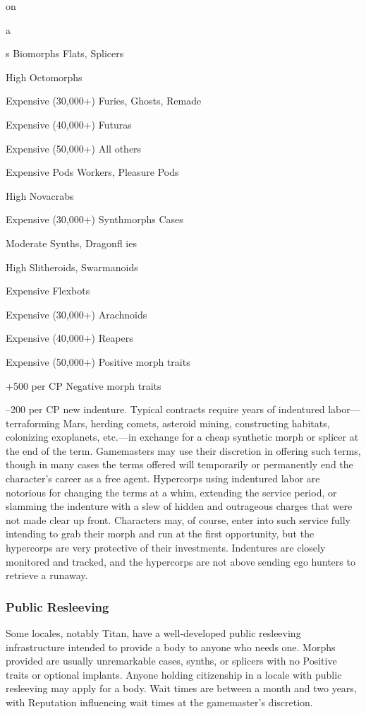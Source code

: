 on 

a

s 
Biomorphs
Flats, Splicers

High
Octomorphs

Expensive (30,000+)
Furies, Ghosts, Remade

Expensive (40,000+)
Futuras

Expensive (50,000+)
All others

Expensive
Pods
Workers, Pleasure Pods

High
Novacrabs

Expensive (30,000+)
Synthmorphs
Cases

Moderate
Synths, Dragonﬂ ies

High
Slitheroids, Swarmanoids

Expensive
Flexbots

Expensive (30,000+)
Arachnoids

Expensive (40,000+)
Reapers

Expensive (50,000+)
Positive morph traits

+500 per CP
Negative morph traits

–200 per CP
new indenture. Typical contracts require years of indentured
labor—terraforming Mars, herding comets,
asteroid mining, constructing habitats, colonizing 
exoplanets, etc.—in exchange for a cheap synthetic 
morph or splicer at the end of the term. Gamemasters 
may use their discretion in offering such terms, though 
in many cases the terms offered will temporarily or 
permanently end the character's career as a free agent. 
Hypercorps using indentured labor are notorious for 
changing the terms at a whim, extending the service 
period, or slamming the indenture with a slew of 
hidden and outrageous charges that were not made 
clear up front. Characters may, of course, enter into 
such service fully intending to grab their morph and 
run at the first opportunity, but the hypercorps are 
very protective of their investments. Indentures are 
closely monitored and tracked, and the hypercorps are 
not above sending ego hunters to retrieve a runaway.

\subsubsection{Public Resleeving}

Some locales, notably Titan, have a well-developed 
public resleeving infrastructure intended to provide a 
body to anyone who needs one. Morphs provided are 
usually unremarkable cases, synths, or splicers with 
no Positive traits or optional implants. Anyone holding
citizenship in a locale with public resleeving may
apply for a body. Wait times are between a month and 
two years, with Reputation influencing wait times at 
the gamemaster's discretion.

